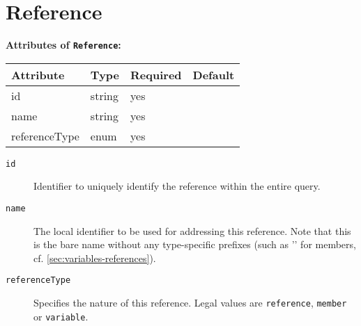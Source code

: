 \documentclass[11pt,a4paper]{report}
\newcommand{\iqlType}[1]{\texttt{\iqlns#1}}
\newenvironment{attributes}[1]{
	\noindent\textbf{Attributes of #1:}\newline\medskip
	\begin{tabular}{|p{0.3\textwidth}|p{0.20\textwidth}|p{0.20\textwidth}|p{0.17\textwidth}|}
		\hline
		\textbf{Attribute} & \textbf{Type} & \textbf{Required} & \textbf{Default} \\ 
		\hline
		\hline
	}{
	\end{tabular}
}
\newcommand{\attribute}[4]{
	#1 & #2 & #3 & #4 \\
	\hline
}
\begin{document}
\section{Reference}
\label{sec:json-ld-reference}
\begin{attributes}{\iqlType{Reference}}
	\attribute{id}{string}{yes}{}
	\attribute{name}{string}{yes}{}
	\attribute{referenceType}{enum}{yes}{}
\end{attributes}
\begin{description}
	\item[\iqlType{id}] Identifier to uniquely identify the reference within the entire query.
	\item[\iqlType{name}] The local identifier to be used for addressing this reference. Note that this is the bare name without any type-specific prefixes (such as '\textdollar' for members, cf. \cref{sec:variables-references}).
	\item[\iqlType{referenceType}] Specifies the nature of this reference. Legal values are \texttt{reference}, \texttt{member} or \texttt{variable}.
\end{description}

\end{document}

